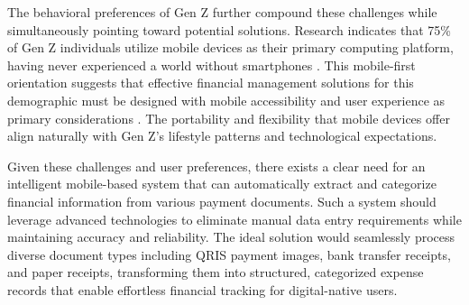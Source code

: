 The behavioral preferences of Gen Z further compound these challenges while simultaneously pointing toward potential solutions. Research indicates that 75\% of Gen Z individuals utilize mobile devices as their primary computing platform, having never experienced a world without smartphones \cite{Campfire2024GenZ}. This mobile-first orientation suggests that effective financial management solutions for this demographic must be designed with mobile accessibility and user experience as primary considerations \cite{wandhe2024new}. The portability and flexibility that mobile devices offer align naturally with Gen Z's lifestyle patterns and technological expectations.

Given these challenges and user preferences, there exists a clear need for an intelligent mobile-based system that can automatically extract and categorize financial information from various payment documents. Such a system should leverage advanced technologies to eliminate manual data entry requirements while maintaining accuracy and reliability. The ideal solution would seamlessly process diverse document types including QRIS payment images, bank transfer receipts, and paper receipts, transforming them into structured, categorized expense records that enable effortless financial tracking for digital-native users.
